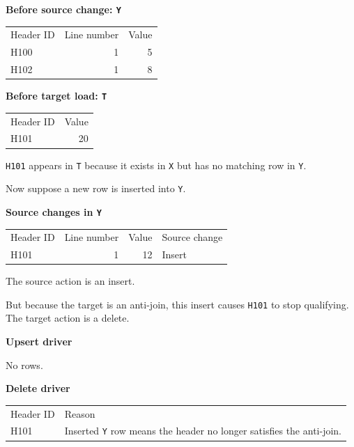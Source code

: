 \documentclass[10pt,openany,10pt]{book}
\newcounter{none}
\let\podeToprule\toprule
\let\podeMidrule\midrule
\let\podeBottomrule\bottomrule
\renewcommand{\toprule}{\arrayrulecolor{pbiGrid}\podeToprule}
\renewcommand{\midrule}{\arrayrulecolor{pbiGrid}\podeMidrule}
\renewcommand{\bottomrule}{\arrayrulecolor{pbiGrid}\podeBottomrule}
\begin{document}
\textbf{Before source change: \texttt{Y}}

{\def\LTcaptype{none} %
\begin{longtable}[]{@{}lrr@{}}
\toprule\noalign{}
Header ID & Line number & Value \\
\midrule\noalign{}
\endhead
\bottomrule\noalign{}
\endlastfoot
H100 & 1 & 5 \\
H102 & 1 & 8 \\
\end{longtable}
}

\textbf{Before target load: \texttt{T}}

{\def\LTcaptype{none} %
\begin{longtable}[]{@{}lr@{}}
\toprule\noalign{}
Header ID & Value \\
\midrule\noalign{}
\endhead
\bottomrule\noalign{}
\endlastfoot
H101 & 20 \\
\end{longtable}
}

\texttt{H101} appears in \texttt{T} because it exists in \texttt{X} but
has no matching row in \texttt{Y}.

Now suppose a new row is inserted into \texttt{Y}.

\textbf{Source changes in \texttt{Y}}

{\def\LTcaptype{none} %
\begin{longtable}[]{@{}lrrl@{}}
\toprule\noalign{}
Header ID & Line number & Value & Source change \\
\midrule\noalign{}
\endhead
\bottomrule\noalign{}
\endlastfoot
H101 & 1 & 12 & Insert \\
\end{longtable}
}

The source action is an insert.

But because the target is an anti-join, this insert causes \texttt{H101}
to stop qualifying. The target action is a delete.

\textbf{Upsert driver}

No rows.

\textbf{Delete driver}

{\def\LTcaptype{none} %
\begin{longtable}[]{@{}
  >{\raggedright\arraybackslash}p{}
  >{\raggedright\arraybackslash}p{}@{}}
\toprule\noalign{}
\begin{minipage}[b]{\linewidth}\raggedright
Header ID
\end{minipage} & \begin{minipage}[b]{\linewidth}\raggedright
Reason
\end{minipage} \\
\midrule\noalign{}
\endhead
\bottomrule\noalign{}
\endlastfoot
H101 & Inserted \texttt{Y} row means the header no longer satisfies the
anti-join. \\
\end{longtable}
}
\end{document}
